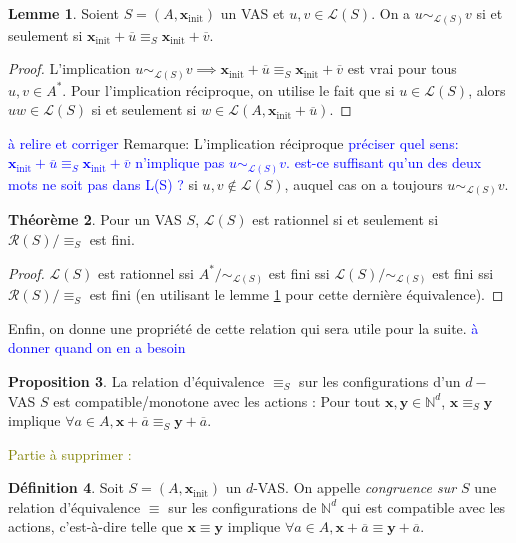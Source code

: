 \documentclass[a4paper,final]{article}
\theoremstyle{definition}
\newtheorem{Theorem}{Théorème}
\newtheorem{Definition}[Theorem]{Définition}
\newtheorem{Proposition}[Theorem]{Proposition}
\newtheorem{Lemma}[Theorem]{Lemme}
\newcommand{\alain}[1]{\textcolor{blue}{#1}}
\newcommand{\lucas}[1]{\textcolor{olive}{#1}}
\newcommand{\N}{\ensuremath{\mathbb{N}}}
\newcommand{\lang}{\ensuremath{\mathcal{L}}}
\newcommand{\conf}{\ensuremath{\mathcal{R}}}
\newcommand{\vect}[1]{\ensuremath{\mathbf{#1}}}
\newcommand{\rel}{\ensuremath{\equiv}}
\newcommand{\xinit}{\ensuremath{\vect{x}_\text{init}}}
\newcommand{\valeur}[1]{\ensuremath{\overline{#1}}}
\begin{document}
\begin{Lemma}\label{lien avec Nérode}
    Soient $S=(A,\xinit)$ un VAS et $u,v\in\lang(S)$.
    On a $u\sim_{\lang(S)}v$ si et seulement si $\xinit +\valeur{u} \rel_S \xinit +\valeur{v}$.
\end{Lemma}

\begin{proof}
L'implication $u\sim_{\lang(S)}v \implies \xinit +\valeur{u} \rel_S \xinit +\valeur{v}$ est vrai pour tous $u,v \in A^*$. Pour l'implication réciproque, on utilise le fait que si $u\in\lang(S)$, alors
$uw\in\lang(S)$ si et seulement si $w\in\lang(A,\xinit +\valeur{u})$.
\end{proof}

\alain{à relire et corriger}
Remarque:  L'implication réciproque \alain{préciser quel sens:  $\xinit +\valeur{u} \rel_S \xinit +\valeur{v}$ n'implique pas $u\sim_{\lang(S)}v$. est-ce suffisant qu'un des deux mots ne soit pas dans L(S) ? } si $u,v\notin\lang(S)$, auquel cas on a toujours $u\sim_{\lang(S)}v$.


\begin{Theorem}
    Pour un VAS $S$, $\lang(S)$ est rationnel si et seulement si $\conf(S)/\rel_S$ est fini.
\end{Theorem}

\begin{proof}
$\lang(S)$ est rationnel 
ssi $A^\ast/\sim_{\lang(S)}$ est fini 
ssi $\lang(S)/\sim_{\lang(S)}$ est fini 
ssi $\conf(S)/\rel_S$ est fini (en utilisant le lemme \ref{lien avec Nérode} pour cette dernière équivalence).
\end{proof}

Enfin, on donne une propriété de cette relation qui sera utile pour la suite. \alain{à donner quand on en a besoin}

\begin{Proposition}
La relation d'équivalence $\rel_S$ sur les configurations d'un $d-$VAS $S$ est compatible/monotone avec les actions :
Pour tout $\vect{x},\vect{y}\in\N^d$, $\vect{x}\rel_S \vect{y}$ implique $\forall a\in A, \vect{x} +\valeur{a} \rel_S \vect{y} +\valeur{a}$.
\end{Proposition}

\lucas{Partie à supprimer :}
\color{red} %

\begin{Definition}
Soit $S=(A,\xinit)$ un $d$-VAS.
On appelle \emph{congruence sur $S$} une relation d'équivalence $\rel$ sur les configurations de $\N^d$ qui est compatible avec les actions, 
c'est-à-dire telle que $\vect{x}\rel \vect{y}$ implique $\forall a\in A, \vect{x} +\valeur{a} \rel \vect{y} +\valeur{a}$.
\end{Definition}
\end{document}
